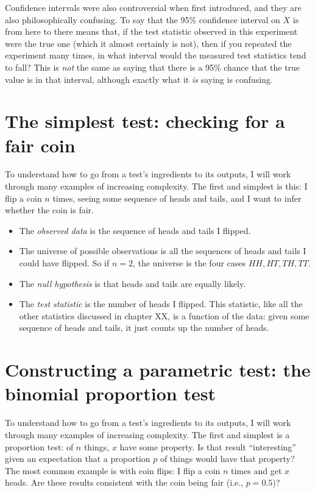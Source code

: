 Confidence intervals were also controversial when first introduced, and they are also philosophically confusing. To say that the 95\% confidence interval on $X$ is from here to there means that, if the test statistic observed in this experiment were the true one (which it almost certainly is not), then if you repeated the experiment many times, in what interval would the measured test statistics tend to fall? This is \emph{not} the same as saying that there is a 95\% chance that the true value is in that interval, although exactly what it \emph{is} saying is confusing.

\section{The simplest test: checking for a fair coin}

To understand how to go from a test's ingredients to its outputs, I will work
through many examples of increasing complexity. The first and simplest is this: I flip a coin $n$ times, seeing some sequence of heads and tails, and I want to infer whether the coin is fair.

\begin{itemize}
\item The \emph{observed data} is the sequence of heads and tails I flipped.
\item The universe of possible observations is all the sequences of heads and tails I could have flipped. So if $n=2$, the universe is the four cases $HH, HT, TH, TT$.
\item The \emph{null hypothesis} is that heads and tails are equally likely.
\item The \emph{test statistic} is the number of heads I flipped. This statistic, like all the other statistics discussed in chapter XX, is a function of the data: given some sequence of heads and tails, it just counts up the number of heads.
\end{itemize}


\section{Constructing a parametric test: the binomial proportion test}

To understand how to go from a test's ingredients to its outputs, I will work
through many examples of increasing complexity. The first and simplest is a proportion test: of $n$ things, $x$ have some property. Is that result ``interesting'' given an expectation that a proportion $p$ of things would have that property? The most common example is with coin flips: I flip a coin $n$ times and get $x$ heads. Are these results consistent with the coin being fair (i.e., $p = 0.5$)?

